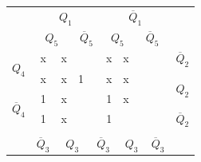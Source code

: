 \documentclass[a4paper,14pt]{article}
\begin{document}
\begin{table}[H]
	\begin{minipage}{.5\linewidth}
		\centering
\begin{tabular}{cccccccccc}
	& \multicolumn{4}{c}{$Q_1$}                                                                        & \multicolumn{4}{c}{$\overline{Q}_1$}                                                            &                        \\
	& \multicolumn{2}{c}{$Q_5$}                       & \multicolumn{2}{c}{$\overline{Q}_5$}           & \multicolumn{2}{c}{$Q_5$}                       & \multicolumn{2}{c}{$\overline{Q}_5$}          &                        \\ \cline{2-9}
	\multicolumn{1}{c|}{\multirow{2}{*}{$Q_4$}}            & \multicolumn{1}{c|}{x} & \multicolumn{1}{c|}{x} & \multicolumn{1}{c|}{}  & \multicolumn{1}{c|}{} & \multicolumn{1}{c|}{x} & \multicolumn{1}{c|}{x} & \multicolumn{1}{c|}{} & \multicolumn{1}{c|}{} & $\overline{Q}_2$       \\ \cline{2-9}
	\multicolumn{1}{c|}{}                                  & \multicolumn{1}{c|}{x} & \multicolumn{1}{c|}{x} & \multicolumn{1}{c|}{1} & \multicolumn{1}{c|}{} & \multicolumn{1}{c|}{x} & \multicolumn{1}{c|}{x} & \multicolumn{1}{c|}{} & \multicolumn{1}{c|}{} & \multirow{2}{*}{$Q_2$} \\ \cline{2-9}
	\multicolumn{1}{c|}{\multirow{2}{*}{$\overline{Q}_4$}} & \multicolumn{1}{c|}{1} & \multicolumn{1}{c|}{x} & \multicolumn{1}{c|}{}  & \multicolumn{1}{c|}{} & \multicolumn{1}{c|}{1} & \multicolumn{1}{c|}{x} & \multicolumn{1}{c|}{} & \multicolumn{1}{c|}{} &                        \\ \cline{2-9}
	\multicolumn{1}{c|}{}                                  & \multicolumn{1}{c|}{1} & \multicolumn{1}{c|}{x} & \multicolumn{1}{c|}{}  & \multicolumn{1}{c|}{} & \multicolumn{1}{c|}{1} & \multicolumn{1}{c|}{}  & \multicolumn{1}{c|}{} & \multicolumn{1}{c|}{} & $\overline{Q}_2$       \\ \cline{2-9}
	&                        & \multicolumn{2}{c}{}                            & \multicolumn{2}{c}{}                           & \multicolumn{2}{c}{}                           &                       &                        \\
	& $\overline{Q}_3$       & \multicolumn{2}{c}{$Q_3$}                       & \multicolumn{2}{c}{$\overline{Q}_3$}           & \multicolumn{2}{c}{$Q_3$}                      & $\overline{Q}_3$      &                       

\end{tabular}
\end{minipage}
\end{table}
\end{document}
